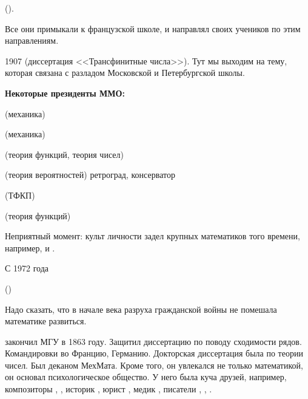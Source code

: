 \documentclass[a4paper,oneside,fleqn,10pt]{article}
\begin{document}
().

Все они примыкали к французской школе, и  направлял своих
учеников по этим направлениям.

1907  (диссертация <<Трансфинитные числа>>). Тут мы
выходим на тему, которая связана с разладом Московской и Петербургской
школы.

\textbf{Некоторые президенты ММО:}

\begin{items}{-2}
\item {}  (механика)
\item {}  (механика)
\item {}  (теория функций, теория
  чисел)
\item {}  (теория вероятностей)
  ретроград, консерватор
\item {}  (ТФКП)
\item {} 
\item {}  (теория функций)

Неприятный момент: культ личности задел крупных математиков того
времени, например,  и .

\item С 1972 года  

\item {} ()
\end{items}

Надо сказать, что в начале века разруха гражданской войны не помешала
математике развиться.

 закончил МГУ в 1863 году. Защитил диссертацию по
поводу сходимости рядов.  Командировки во Францию,
Германию. Докторская диссертация была по теории чисел.  Был деканом
МехМата. Кроме того, он увлекался не только математикой, он основал
психологическое общество.  У него была куча друзей, например,
композиторы , , историк ,
юрист , медик , писатели
, , .
\end{document}
